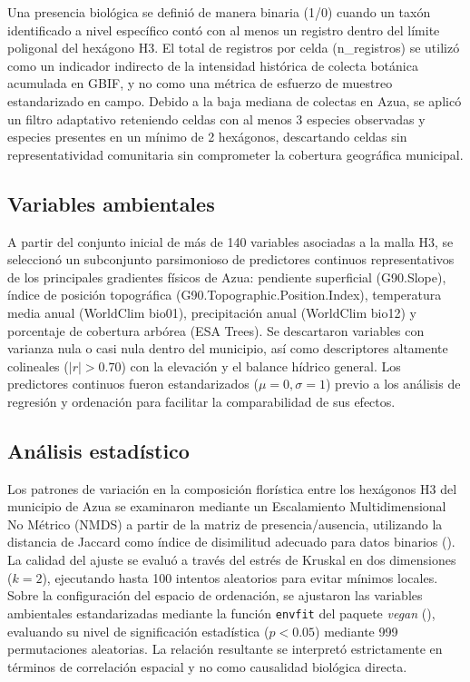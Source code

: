 \documentclass[
  12pt,
  man,
  floatsintext]{apa7}
\begin{document}
Una presencia biológica se definió de manera binaria (1/0) cuando un taxón identificado a nivel específico contó con al menos un registro dentro del límite poligonal del hexágono H3. El total de registros por celda (n\_registros) se utilizó como un indicador indirecto de la intensidad histórica de colecta botánica acumulada en GBIF, y no como una métrica de esfuerzo de muestreo estandarizado en campo. Debido a la baja mediana de colectas en Azua, se aplicó un filtro adaptativo reteniendo celdas con al menos 3 especies observadas y especies presentes en un mínimo de 2 hexágonos, descartando celdas sin representatividad comunitaria sin comprometer la cobertura geográfica municipal.

\subsection{Variables ambientales}\label{variables-ambientales}

A partir del conjunto inicial de más de 140 variables asociadas a la malla H3, se seleccionó un subconjunto parsimonioso de predictores continuos representativos de los principales gradientes físicos de Azua: pendiente superficial (G90.Slope), índice de posición topográfica (G90.Topographic.Position.Index), temperatura media anual (WorldClim bio01), precipitación anual (WorldClim bio12) y porcentaje de cobertura arbórea (ESA Trees). Se descartaron variables con varianza nula o casi nula dentro del municipio, así como descriptores altamente colineales (\(|r| > 0.70\)) con la elevación y el balance hídrico general. Los predictores continuos fueron estandarizados (\(\mu = 0, \sigma = 1\)) previo a los análisis de regresión y ordenación para facilitar la comparabilidad de sus efectos.

\subsection{Análisis estadístico}\label{anuxe1lisis-estaduxedstico}

Los patrones de variación en la composición florística entre los hexágonos H3 del municipio de Azua se examinaron mediante un Escalamiento Multidimensional No Métrico (NMDS) a partir de la matriz de presencia/ausencia, utilizando la distancia de Jaccard como índice de disimilitud adecuado para datos binarios (). La calidad del ajuste se evaluó a través del estrés de Kruskal en dos dimensiones (\(k = 2\)), ejecutando hasta 100 intentos aleatorios para evitar mínimos locales. Sobre la configuración del espacio de ordenación, se ajustaron las variables ambientales estandarizadas mediante la función \texttt{envfit} del paquete \emph{vegan} (), evaluando su nivel de significación estadística (\(p < 0.05\)) mediante 999 permutaciones aleatorias. La relación resultante se interpretó estrictamente en términos de correlación espacial y no como causalidad biológica directa.
\end{document}
